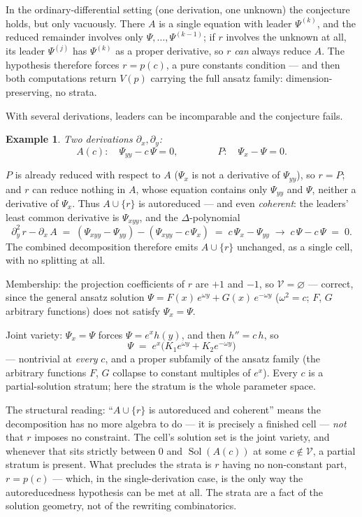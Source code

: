 \documentclass[11pt]{article}
\newcommand{\Psib}{\Psi}
\newcommand{\Var}{\mathcal{V}}
\DeclareMathOperator{\Sol}{Sol}
\newtheorem{example}{Example}
\begin{document}
In the ordinary-differential setting (one derivation, one unknown) the
conjecture holds, but only vacuously. There $A$ is a single equation with
leader $\Psib^{(k)}$, and the reduced remainder involves only
$\Psib, \dots, \Psib^{(k-1)}$; if $r$ involves the unknown at all, its leader
$\Psib^{(j)}$ has $\Psib^{(k)}$ as a proper derivative, so $r$ \emph{can}
always reduce $A$. The hypothesis therefore forces $r = p(c)$, a pure
constants condition --- and then both computations return $V(p)$ carrying the
full ansatz family: dimension-preserving, no strata.

With several derivations, leaders can be incomparable and the conjecture
fails.

\begin{example}
\label{ex:pde}
Two derivations $\partial_x, \partial_y$:
%
\[
A(c): \quad \Psib_{yy} - c\,\Psib = 0,
\qquad\qquad
P: \quad \Psib_x - \Psib = 0 .
\]
\end{example}

\noindent
$P$ is already reduced with respect to $A$ ($\Psib_x$ is not a derivative of
$\Psib_{yy}$), so $r = P$; and $r$ can reduce nothing in $A$, whose equation
contains only $\Psib_{yy}$ and $\Psib$, neither a derivative of $\Psib_x$.
Thus $A \cup \{r\}$ is autoreduced --- and even \emph{coherent}: the leaders'
least common derivative is $\Psib_{xyy}$, and the $\Delta$-polynomial
%
\[
\partial_y^2\, r - \partial_x\, A
\;=\; (\Psib_{xyy} - \Psib_{yy}) - (\Psib_{xyy} - c\,\Psib_x)
\;=\; c\,\Psib_x - \Psib_{yy}
\;\longrightarrow\; c\,\Psib - c\,\Psib \;=\; 0 .
\]
%
The combined decomposition therefore emits $A \cup \{r\}$ unchanged, as a
single cell, with no splitting at all.

Membership: the projection coefficients of $r$ are $+1$ and $-1$, so
$\Var = \varnothing$ --- correct, since the general ansatz solution
$\Psib = F(x)\,e^{\omega y} + G(x)\,e^{-\omega y}$ ($\omega^2 = c$; $F$, $G$
arbitrary functions) does not satisfy $\Psib_x = \Psib$.

Joint variety: $\Psib_x = \Psib$ forces $\Psib = e^{x} h(y)$, and then
$h'' = c\,h$, so
%
\[
\Psib \;=\; e^{x}\big(K_1 e^{\omega y} + K_2 e^{-\omega y}\big)
\]
%
--- nontrivial at \emph{every} $c$, and a proper subfamily of the ansatz
family (the arbitrary functions $F$, $G$ collapse to constant multiples of
$e^{x}$). Every $c$ is a partial-solution stratum; here the stratum is the
whole parameter space.

The structural reading: ``$A \cup \{r\}$ is autoreduced and coherent'' means
the decomposition has no more algebra to do --- it is precisely a finished
cell --- \emph{not} that $r$ imposes no constraint. The cell's solution set
is the joint variety, and whenever that sits strictly between $0$ and
$\Sol(A(c))$ at some $c \notin \Var$, a partial stratum is present. What
precludes the strata is $r$ having no non-constant part, $r = p(c)$ ---
which, in the single-derivation case, is the only way the autoreducedness
hypothesis can be met at all. The strata are a fact of the solution
geometry, not of the rewriting combinatorics.
\end{document}

